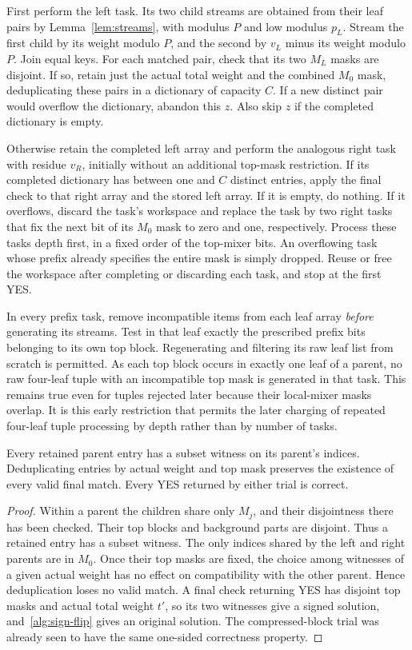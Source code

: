 First perform the left task.  Its two child streams are obtained from
their leaf pairs by Lemma~\ref{lem:streams}, with modulus $P$ and low
modulus $p_L$.  Stream the first child by its weight modulo $P$, and
the second by $v_L$ minus its weight modulo $P$.  Join equal keys.
For each matched pair, check that its two $M_L$ masks are disjoint.
If so, retain just the actual total weight and the combined $M_0$ mask,
deduplicating these pairs in a dictionary of capacity $C$.  If a new
distinct pair would overflow the dictionary, abandon this $z$.  Also
skip $z$ if the completed dictionary is empty.

Otherwise retain the completed left array and perform the analogous
right task with residue $v_R$, initially without an additional top-mask
restriction.  If its completed dictionary has between one and $C$
distinct entries, apply the final check to that right array and the
stored left array.  If it is empty, do nothing.  If it overflows,
discard the task's workspace and replace the task by two right tasks
that fix the next bit of its $M_0$ mask to zero and one, respectively.
Process these tasks depth first, in a fixed order of the top-mixer bits.
An overflowing task whose prefix already specifies the entire mask is
simply dropped.  Reuse or free the workspace after completing or
discarding each task, and stop at the first YES.

In every prefix task, remove incompatible items from each
leaf array \emph{before} generating its streams.  Test in that leaf
exactly the prescribed prefix bits belonging to its own top block.
Regenerating and filtering its raw leaf list from scratch is permitted.
As each top block occurs in exactly one leaf of a parent, no raw
four-leaf tuple with an incompatible top mask is generated in that
task.  This remains true even for tuples rejected later because their
local-mixer masks overlap.  It is this early restriction that permits
the later charging of repeated four-leaf tuple processing by depth
rather than by number of tasks.

\begin{lemma}\label{alg:validity}
Every retained parent entry has a subset witness on its parent's
indices.  Deduplicating entries by actual weight and top mask preserves
the existence of every valid final match.  Every YES returned by either
trial is correct.
\end{lemma}

\begin{proof}
Within a parent the children share only $M_j$, and their disjointness
there has been checked.  Their top blocks and background parts are
disjoint.  Thus a retained entry has a subset witness.  The only
indices shared by the left and right parents are in $M_0$.  Once their
top masks are fixed, the choice among witnesses of a given actual
weight has no effect on compatibility with the other parent.  Hence
deduplication loses no valid match.  A final check returning YES has
disjoint top masks and actual total weight $t'$, so its two witnesses
give a signed solution, and~\eqref{alg:sign-flip} gives an original
solution.  The compressed-block trial was already seen to have the
same one-sided correctness property.
\end{proof}

